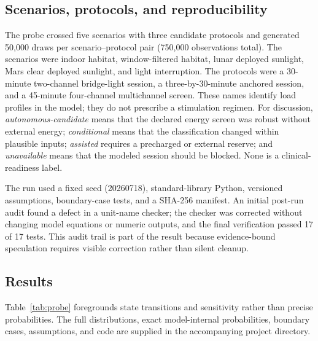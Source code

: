 \documentclass[runningheads]{llncs}
\begin{document}
\subsection{Scenarios, protocols, and reproducibility}

The probe crossed five scenarios with three candidate protocols and generated 50,000 draws per scenario--protocol pair (750,000 observations total). The scenarios were indoor habitat, window-filtered habitat, lunar deployed sunlight, Mars clear deployed sunlight, and light interruption. The protocols were a 30-minute two-channel bridge-light session, a three-by-30-minute anchored session, and a 45-minute four-channel multichannel screen. These names identify load profiles in the model; they do not prescribe a stimulation regimen. For discussion, \emph{autonomous-candidate} means that the declared energy screen was robust without external energy; \emph{conditional} means that the classification changed within plausible inputs; \emph{assisted} requires a precharged or external reserve; and \emph{unavailable} means that the modeled session should be blocked. None is a clinical-readiness label.

The run used a fixed seed (20260718), standard-library Python, versioned assumptions, boundary-case tests, and a SHA-256 manifest. An initial post-run audit found a defect in a unit-name checker; the checker was corrected without changing model equations or numeric outputs, and the final verification passed 17 of 17 tests. This audit trail is part of the result because evidence-bound speculation requires visible correction rather than silent cleanup.

\subsection{Results}

Table~\ref{tab:probe} foregrounds state transitions and sensitivity rather than precise probabilities. The full distributions, exact model-internal probabilities, boundary cases, assumptions, and code are supplied in the accompanying project directory.
\end{document}
